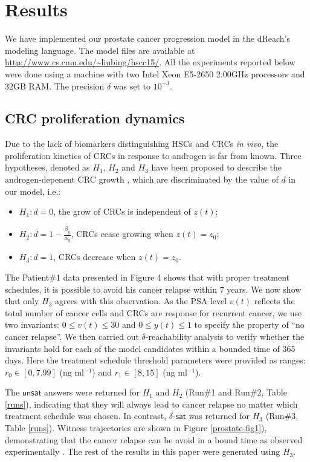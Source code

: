 \section{Results}\label{sec.results}

We have implemented our prostate cancer progression model in the dReach's modeling language. The model files are available at \url{http://www.cs.cmu.edu/~liubing/hscc15/}. All the experiments reported below were done using a machine with two Intel Xeon E5-2650 2.00GHz processors and 32GB RAM. The precision $\delta$ was set to $10^{-3}$. 

\subsection{CRC proliferation dynamics}
Due to the lack of biomarkers distinguishing HSCs and CRCs \textit{in vivo}, the proliferation kinetics of CRCs in response to androgen is far from known. Three hypotheses, denoted as $H_1$, $H_2$ and $H_3$ have been proposed to describe the androgen-depenent CRC growth \cite{ideta08}, which are discriminated by the value of $d$ in our model, i.e.:
\begin{itemize}
\item $H_1: d = 0$, the grow of CRCs is independent of $z(t)$;
\item $H_2: d = 1-\frac{\beta_y}{\alpha_y}$, CRCs cease growing when $z(t)=z_0$;
\item $H_3: d = 1$, CRCs decrease when $z(t)=z_0$.
\end{itemize} 

The Patient\#1 data presented in Figure 4 shows that with proper treatment schedules, it is possible to avoid his cancer relapse within $7$ years. We now show that only $H_3$ agrees with this observation. As the PSA level $v(t)$ reflects the total number of cancer cells and CRCs are response for recurrent cancer, we use two invariants: $0 \le v(t) \le 30$ and $0 \le y(t) \le 1$ to specify the property of ``no cancer relapse''. We then carried out $\delta$-reachability analysis to verify whether the invariants hold for each of the model candidates within a bounded time of $365$ days. Here the treatment schedule threshold parameters were provided as ranges: $r_0 \in [0, 7.99]$ (ng ml$^{-1}$) and $r_1 \in [8,15]$ (ng ml$^{-1}$).


The $\mathsf{unsat}$ answers were returned for $H_1$ and $H_2$ (Run\#1 and Run\#2, Table \ref{runs}), indicating that they will always lead to cancer relapse no matter which 
treatment schedule 
was chosen. In contrast, $\delta$-$\mathsf{sat}$ was returned for $H_3$ (Run\#3, Table \ref{runs}). Witness trajectories are shown in Figure \ref{prostate-fig1}), demonstrating that the cancer relapse can be avoid in a bound time as observed experimentally \cite{ bruchovsky06,bruchovsky07}. The rest of the results in this paper were generated using $H_3$.

